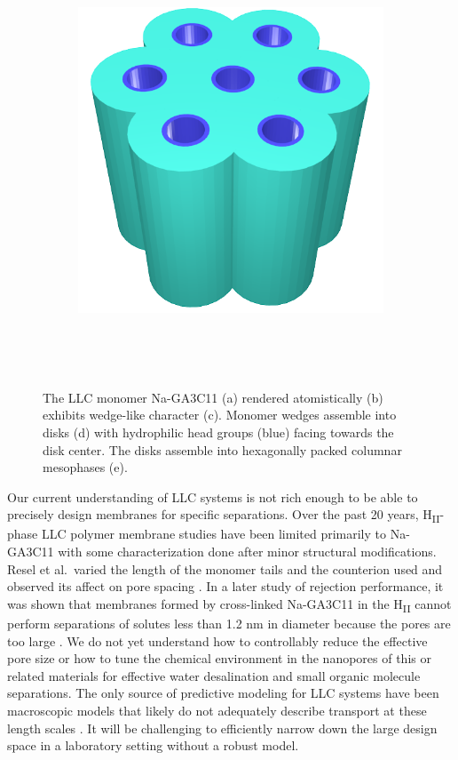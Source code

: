 \documentclass{article}
\begin{document}
\begin{figure}
\begin{subfigure}{0.4\linewidth}
		\centering
		\includegraphics[width=\textwidth]{hexagonal_packing.png}
		\caption{}~\label{fig:hex_packing_simple}
	\end{subfigure}
	\caption{The LLC monomer Na-GA3C11 (a) rendered atomistically (b)
	exhibits wedge-like character (c). Monomer wedges assemble into disks (d) with
	hydrophilic head groups (blue) facing towards the disk center. The disks
	assemble into hexagonally packed columnar mesophases (e).}~\label{fig:assembly}
  \end{figure}

  Our current understanding of LLC systems is not rich enough to be able to
  precisely design membranes for specific separations. Over the past 20 years,
  H\textsubscript{II}-phase LLC polymer membrane studies have been limited
  primarily to Na-GA3C11 with some characterization done after minor structural
  modifications.  Resel et al.~varied the length of the monomer tails and the
  counterion used and observed its affect on pore spacing
  \cite{resel_structural_2000}.  In a later study of rejection performance, it
  was shown that membranes formed by cross-linked Na-GA3C11 in the
  H\textsubscript{II} cannot perform separations of solutes less than 1.2 nm in
  diameter because the pores are too large \cite{zhou_supported_2005}.  We do not
  yet understand how to controllably reduce the effective pore size or how to
  tune the chemical environment in the nanopores of this or related materials for
  effective water desalination and small organic molecule separations. The only
  source of predictive modeling for LLC systems have been macroscopic models that
  likely do not adequately describe transport at these length scales
  \cite{hatakeyama_water_2011}. It will be challenging to efficiently narrow down
  the large design space in a laboratory setting without a robust model.
\end{document}
